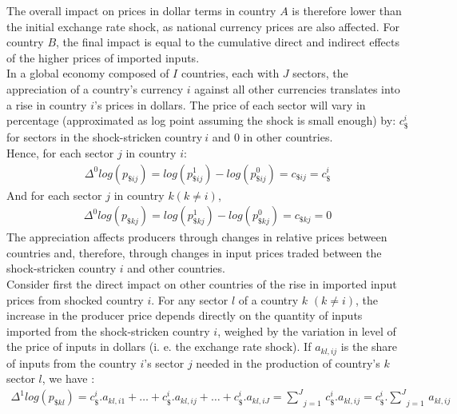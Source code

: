 \documentclass[11pt,a4paper]{article}
\begin{document}
The overall impact on prices in dollar terms in country $A$ is therefore lower than the initial exchange rate shock, as national currency prices are also affected. 
For country $B$, the final impact is equal to the cumulative direct and indirect effects of the higher prices of imported inputs.\\





In a global economy composed of $I$ countries, each with $J$ sectors, the appreciation of a country's currency $i$ against all other currencies translates into a rise in country $i$'s prices in dollars. The price of each sector will vary in percentage (approximated as log point assuming the shock is small enough) by: $c_\$^i$ for sectors in the shock-stricken country$~i$ and 0 in other countries. \\
Hence, for each sector $j$ in country $i$:
\begin{eqnarray*}
 {{\Delta }^{0}}log(p_{\${ij}})=log(p_{\${ij}}^{1})-log(p_{\${ij}}^{0})=c_{\${ij}}=c_{\$}^i
  \end{eqnarray*}	
And for each sector $j$ in country $k (k\ne i)$,
\begin{eqnarray*}
 {{\Delta }^{0}}log(p_{\${kj}})=log(p_{\${kj}}^{1})-log(p_{\${kj}}^{0})=c_{\${kj}}=0
 \end{eqnarray*}	
The appreciation affects producers through changes in relative prices between countries and, therefore, through changes in input prices traded between the shock-stricken country $i$ and other countries. \\
Consider first the direct impact on other countries of the rise in imported input prices from shocked country $i$. 
For any sector $l$ of a country $k$ $(k\ne i)$, the increase in the producer price depends directly on the quantity of inputs imported from the shock-stricken country $i$, weighed by the variation in level of the price of inputs in dollars (i. e. the exchange rate shock). If $a_{kl,ij}$ is the share of inputs from the country $i$'s sector $j$ needed in the production of country's $k$ sector $l$, we have :\\
\begin{eqnarray}
\Delta ^1 log(p_{\${kl}})=c_\$^i.a_{kl,i1}+\ldots+c_\$^i.a_{kl,ij}+\ldots+c_\$^i.a_{kl,iJ}=\underset{j=1}{\overset{J}{\mathop\sum}}\,c_\$^i.a_{kl,ij}=c_\$^i.\underset{j=1}{\overset{J}{\mathop\sum}}\,a_{kl,ij}  
\label{eq:eq1} 
\end{eqnarray}
\\
\end{document}
